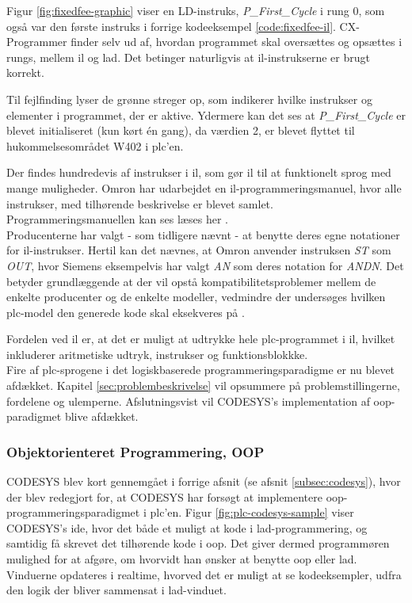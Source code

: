 
\noindent Figur \ref{fig:fixedfee-graphic} viser en LD-instruks, \textit{P\_First\_Cycle} i rung 0, som også var den første instruks i forrige kodeeksempel \ref{code:fixedfee-il}. CX-Programmer finder selv ud af, hvordan programmet skal oversættes og opsættes i rungs, mellem \gls{il} og \gls{lad}. Det betinger naturligvis at \gls{il}-instrukserne er brugt korrekt. 

Til fejlfinding lyser de grønne streger op, som indikerer hvilke instrukser og elementer i programmet, der er aktive. Ydermere kan det ses at \textit{P\_First\_Cycle} er blevet initialiseret (kun kørt én gang), da værdien 2, er blevet flyttet til hukommelsesområdet W402 i \gls{plc}'en.

Der findes hundredevis af instrukser i \gls{il}, som gør \gls{il} til at funktionelt sprog med mange muligheder. Omron har udarbejdet en \gls{il}-programmeringsmanuel, hvor alle instrukser, med tilhørende beskrivelse er blevet samlet. Programmeringsmanuellen kan ses læses her \cite{omron-il-manuel}. \\ 

\noindent Producenterne har valgt - som tidligere nævnt - at benytte deres egne notationer for \gls{il}-instrukser. Hertil kan det nævnes, at Omron anvender instruksen \textit{ST} som \textit{OUT}, hvor Siemens eksempelvis har valgt \textit{AN} som deres notation for \textit{ANDN}. Det betyder grundlæggende at der vil opstå kompatibilitetsproblemer mellem de enkelte producenter og de enkelte modeller, vedmindre der undersøges hvilken \gls{plc}-model den generede kode skal eksekveres på \cite{FDB_desc}.

Fordelen ved \gls{il} er, at det er muligt at udtrykke hele \gls{plc}-programmet i \gls{il}, hvilket inkluderer aritmetiske udtryk, instrukser og funktionsblokkke. \\

\noindent Fire af \gls{plc}-sprogene i det logiskbaserede programmeringsparadigme er nu blevet afdækket. Kapitel \ref{sec:problembeskrivelse} vil opsummere på problemstillingerne, fordelene og ulemperne. Afslutningsvist vil CODESYS's implementation af \gls{oop}-paradigmet blive afdækket.

\label{subsec:software_codesys}
\subsubsection{Objektorienteret Programmering, OOP }
\noindent CODESYS blev kort gennemgået i forrige afsnit (se afsnit \ref{subsec:codesys}), hvor der blev redegjort for, at CODESYS har forsøgt at implementere \gls{oop}-programmeringsparadigmet i \gls{plc}'en. Figur \ref{fig:plc-codesys-sample} viser CODESYS's \gls{ide}, hvor det både et muligt at kode i \gls{lad}-programmering, og samtidig få skrevet det tilhørende kode i \gls{oop}. Det giver dermed programmøren mulighed for at afgøre, om hvorvidt han ønsker at benytte \gls{oop} eller \gls{lad}. Vinduerne opdateres i realtime, hvorved det er muligt at se kodeeksempler, udfra den logik der bliver sammensat i \gls{lad}-vinduet. 

